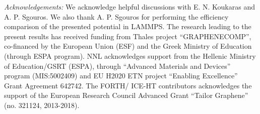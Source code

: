 \documentclass[aps,prb,floatfix,twocolumn,showpacs]{revtex4}
\begin{document}
{\it Acknowledgements:}
We acknowledge helpful discussions with E. N. Koukaras and A. P. Sgouros.
We also thank A. P. Sgouros for performing the efficiency comparison of the presented potential in LAMMPS.
The research leading to the present results has received funding from Thales project
``GRAPHENECOMP'', co-financed by the European Union (ESF) and the Greek Ministry of Education 
(through ESPA program). NNL  acknowledges support from the Hellenic Ministry of Education/GSRT (ESPA), through 
``Advanced Materials and Devices'' program (MIS:5002409) and EU H2020 ETN project ``Enabling Excellence'' Grant 
Agreement 642742. The FORTH/ ICE-HT contributors acknowledges the support of the European Research Council 
Advanced Grant ``Tailor Graphene'' (no. 321124, 2013-2018).

% 
\end{document}
